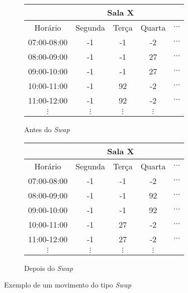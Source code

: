 \begin{figure}[h!]
    \tiny
    \begin{subfigure}[b]{0.5\textwidth}
    \centering
    \begin{tabular}{|c|c|c|c|c|}
        \hline
        & \multicolumn{3}{c|}{Sala X} &  \\ \hline
        Horário & Segunda & Terça & Quarta & $\cdots$ \\ \hline
        07:00-08:00 & -1 & -1 & -2 & $\cdots$ \\ \hline
        08:00-09:00 & -1 & -1 & \cellcolor[HTML]{CBCEFB}27 & $\cdots$ \\ \hline
        09:00-10:00 & -1 & -1 & \cellcolor[HTML]{CBCEFB}27 & $\cdots$ \\ \hline
        10:00-11:00 & -1 & \cellcolor[HTML]{FFCE93}92 & -2 & $\cdots$ \\ \hline
        11:00-12:00 & -1 & \cellcolor[HTML]{FFCE93}92 & -2 & $\cdots$ \\ \hline
        $\vdots$ & $\vdots$ & $\vdots$ & $\vdots$ &  \\ \hline
    \end{tabular}
    \caption{Antes do \textit{Swap}}
    \label{swap:a}
    \end{subfigure}
    \hfill
    \begin{subfigure}[b]{0.5\textwidth}
    \centering
    \begin{tabular}{|c|c|c|c|c|}
        \hline
        & \multicolumn{3}{c|}{Sala X} &  \\ \hline
        Horário & Segunda & Terça & Quarta & $\cdots$ \\ \hline
        07:00-08:00 & -1 & -1 & -2 & $\cdots$ \\ \hline
        08:00-09:00 & -1 & -1 & \cellcolor[HTML]{FFCE93}92 & $\cdots$ \\ \hline
        09:00-10:00 & -1 & -1 & \cellcolor[HTML]{FFCE93}92 & $\cdots$ \\ \hline
        10:00-11:00 & -1 & \cellcolor[HTML]{CBCEFB}27 & -2 & $\cdots$ \\ \hline
        11:00-12:00 & -1 & \cellcolor[HTML]{CBCEFB}27 & -2 & $\cdots$ \\ \hline
        $\vdots$ & $\vdots$ & $\vdots$ & $\vdots$ &  \\ \hline
    \end{tabular}
    \caption{Depois do \textit{Swap}}
    \label{swap:b}
    \end{subfigure}
    \caption{Exemplo de um movimento do tipo \textit{Swap}}
    \label{swap}
\end{figure}


